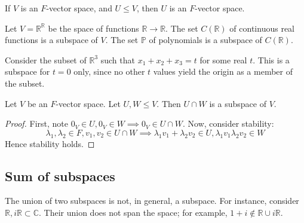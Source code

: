\begin{proposition}
	If \( V \) is an \( F \)-vector space, and \( U \leq V \), then \( U \) is an \( F \)-vector space.
\end{proposition}

\begin{example}
	Let \( V = \mathbb R^{\mathbb R} \) be the space of functions \( \mathbb R \to \mathbb R \).
	The set \( C(\mathbb R) \) of continuous real functions is a subspace of \( V \).
	The set \( \mathbb P \) of polynomials is a subspace of \( C(\mathbb R) \).
\end{example}
\begin{example}
	Consider the subset of \( \mathbb R^3 \) such that \( x_1 + x_2 + x_3 = t \) for some real \( t \).
	This is a subspace for \( t = 0 \) only, since no other \( t \) values yield the origin as a member of the subset.
\end{example}

\begin{proposition}
	Let \( V \) be an \( F \)-vector space.
	Let \( U, W \leq V \).
	Then \( U \cap W \) is a subspace of \( V \).
\end{proposition}
\begin{proof}
	First, note \( 0_V \in U, 0_V \in W \implies 0_V \in U \cap W \).
	Now, consider stability:
	\[
		\lambda_1, \lambda_2 \in F, v_1, v_2 \in U \cap W \implies \lambda_1 v_1 + \lambda_2 v_2 \in U, \lambda_1 v_1 \lambda_2 v_2 \in W
	\]
	Hence stability holds.
\end{proof}

\subsection{Sum of subspaces}
\begin{remark}
	The union of two subspaces is not, in general, a subspace.
	For instance, consider \( \mathbb R, i\mathbb R \subset \mathbb C \).
	Their union does not span the space; for example, \( 1 + i \notin \mathbb R \cup i\mathbb R \).
\end{remark}

